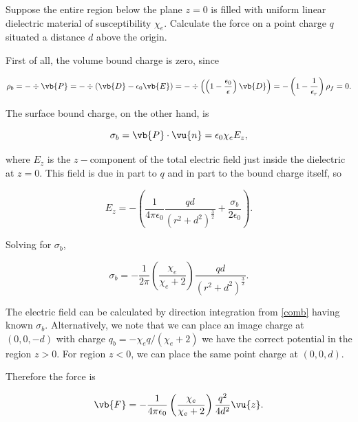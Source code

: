 \documentclass[english,a4paper,12pt]{report}
\begin{document}
{Suppose the entire region below the plane \(z=0\) is filled with uniform linear dielectric material of susceptibility \(\chi _{e} \). Calculate the force on a point charge \(q\) situated a distance \(d\) above the origin.}
{First of all, the volume bound charge is zero, since

\begin{equation}
    \rho _{b} = - \div{\vb{P} } = - \div{\left( \vb{D} - \epsilon _{0}\vb{E} \right)} = - \div{\left( \left(1- \frac{\epsilon _{0} }{\epsilon } \right) \vb{D} \right)} = - \left( 1- \frac{1}{\epsilon _{r} }  \right) \rho _{f} = 0.   \label{boundfree} 
\end{equation}

The surface bound charge, on the other hand, is

\begin{equation}
    \sigma _{b} = \vb{P} \cdot \vu{n} = \epsilon _{0} \chi _{e}E_{z},    
\end{equation}

where \(E_{z} \) is the \(z-\)component of the total electric field just inside the dielectric at \(z=0\). This field is due in part to \(q\) and in part to the bound charge itself, so 

\begin{equation}
    E_{z} = - \left( \frac{1}{4\pi \epsilon_0} \frac{qd}{(r^2+d^2)^{\frac{3}{2} } } + \frac{\sigma _{b} }{2\epsilon _{0} }  \right).
\end{equation}

Solving for \(\sigma _{b} \), 

\begin{equation}
    \sigma _{b} = - \frac{1}{2\pi }\left( \frac{\chi _{e} }{\chi _{e}+2 }  \right)\frac{qd}{(r^2+d^2)^{\frac{3}{2} } }.   
\end{equation}

The electric field can be calculated by direction integration from \cref{comb} having known \(\sigma _{b} \). Alternatively, we note that we can place an image charge at \((0,0,-d)\) with charge \( q_{b} = -\chi _{e}q/(\chi _{e}+2 )   \) we have the correct potential in the region \(z > 0\). For region \(z < 0\), we can place the same point charge at \((0,0,d)\).

Therefore the force is 

\begin{equation}
    \vb{F} = - \frac{1}{4\pi \epsilon_0} \left( \frac{\chi _{e} }{\chi _{e}+2 }  \right) \frac{q^2}{4d^2}\vu{z} . 
\end{equation}
} 
\end{document}

